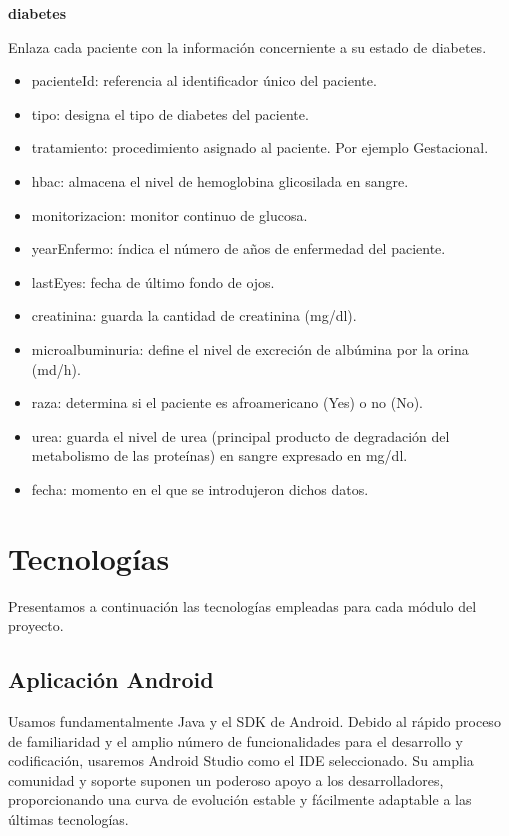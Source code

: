 \documentclass[11pt,spanish,
		listoftables,listoffigures]
		{tfgplantilla}
\begin{document}
\noindent
\textbf {diabetes}

Enlaza cada paciente con la información concerniente a su estado de diabetes.
\begin{itemize}
	\item pacienteId: referencia al identificador único del paciente. 
	\item tipo: designa el tipo de diabetes del paciente.
	\item tratamiento: procedimiento asignado al paciente. Por ejemplo Gestacional.
	\item hbac: almacena el nivel de hemoglobina glicosilada en sangre.
	\item monitorizacion: monitor continuo de glucosa.
	\item yearEnfermo: índica el número de años de enfermedad del paciente.
	\item lastEyes: fecha de último fondo de ojos.
	\item creatinina: guarda la cantidad de creatinina (mg/dl).
	\item microalbuminuria: define el nivel de excreción de albúmina por la orina (md/h).
	\item raza: determina si el paciente es afroamericano (Yes) o no (No).
	\item urea: guarda el nivel de urea (principal producto de degradación del metabolismo de las proteínas) en sangre expresado en mg/dl.
	\item fecha: momento en el que se introdujeron dichos datos.	
\end{itemize}


\chapter{Tecnolog\'ias}

Presentamos a continuación las tecnologías empleadas para cada módulo del proyecto. 

\section {Aplicación Android}

Usamos fundamentalmente Java y el SDK de Android. Debido al rápido proceso de familiaridad y el amplio número de funcionalidades para el desarrollo y codificación, usaremos Android Studio como el IDE seleccionado. Su amplia comunidad y soporte suponen un poderoso apoyo a los desarrolladores, proporcionando una curva de evolución estable y fácilmente adaptable a las últimas tecnologías.
\end{document}
